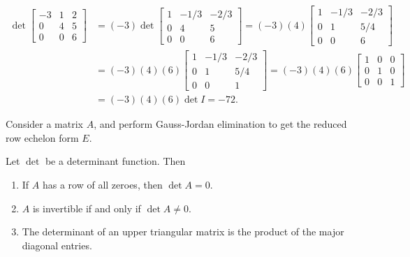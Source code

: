 \begin{exmp}
    \begin{align*}
        \det \begin{bmatrix}
            -3 & 1 & 2 \\ 0 & 4 & 5 \\ 0 & 0 & 6
        \end{bmatrix} &= (-3)\det\begin{bmatrix}
            1 & -1/3 & -2/3 \\ 0 & 4 & 5 \\ 0 & 0 & 6
        \end{bmatrix} = (-3)(4)\begin{bmatrix}
            1 & -1/3 & -2/3 \\ 0 & 1 & 5/4 \\ 0 & 0 & 6
        \end{bmatrix} \\
        &= (-3)(4)(6)\begin{bmatrix}
            1 & -1/3 & -2/3 \\ 0 & 1 & 5/4 \\ 0 & 0 & 1
        \end{bmatrix} = (-3)(4)(6)\begin{bmatrix}
            1 & 0 & 0 \\ 0 & 1 & 0 \\ 0 & 0 & 1
        \end{bmatrix} \\
        &= (-3)(4)(6)\det I = -72.
    \end{align*}
\end{exmp}

\begin{rmk}
    Consider a matrix $A$, and perform Gauss-Jordan elimination to get the reduced row echelon form $E$.
\end{rmk}

\begin{prop}\label{det-zero}
    Let $\det$ be a determinant function. Then
    \begin{enumerate}[label=(\arabic*)]
        \item If $A$ has a row of all zeroes, then $\det A = 0$.
        \item $A$ is invertible if and only if $\det A \neq 0$.
        \item The determinant of an upper triangular matrix is the product of the major diagonal entries.
    \end{enumerate}
\end{prop}

